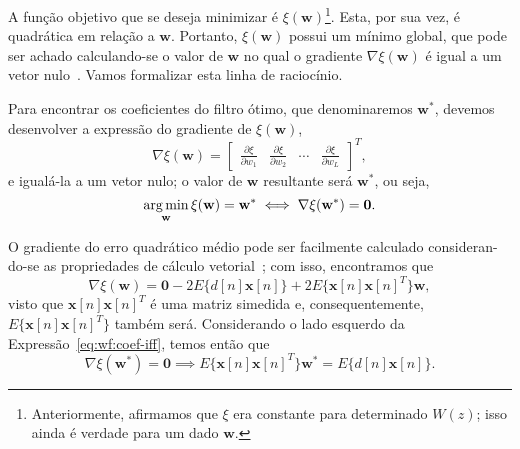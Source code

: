 A função objetivo que se deseja minimizar é $\xi(\mathbf{w})$\footnote{Anteriormente,
	afirmamos que $\xi$ era constante para determinado $W(z)$; isso ainda é verdade para um
	dado $\mathbf{w}$.}. Esta, por sua vez, é quadrática em relação a $\mathbf{w}$.
Portanto, $\xi(\mathbf{w})$ possui um mínimo global, que pode ser achado calculando-se
o valor de $\mathbf{w}$ no qual o gradiente $\nabla
	\xi(\mathbf{w})$ é igual a um vetor
nulo~\cite{diniz-2020}. Vamos formalizar esta linha de raciocínio.

Para encontrar os coeficientes do filtro ótimo, que denominaremos
$\mathbf{w}^*$, devemos
desenvolver a expressão do gradiente de $\xi(\mathbf{w})$,
\begin{equation}
	\nabla\xi(\mathbf{w}) = \begin{bmatrix} \displaystyle \frac{\partial \xi}{\partial w_1} & \displaystyle \frac{\partial \xi}{\partial w_2} & \cdots & \displaystyle \frac{\partial \xi}{\partial w_L} \end{bmatrix}^T,
\end{equation}
e igualá-la a um vetor nulo; o valor de $\mathbf{w}$ resultante será $\mathbf{w}^*$, ou seja,
\begin{equation}
	\operatorname*{arg\,min}_{\mathbf{w}} \xi(\mathbf{w}) = \mathbf{w}^* \iff \nabla\xi(\mathbf{w}^*) = \mathbf{0}.
	\label{eq:wf:coef-iff}
\end{equation}

O gradiente do erro quadrático médio pode ser facilmente calculado consideran-\\do-se
as propriedades de cálculo vetorial~\cite{matrix-cookbook}; com isso, encontramos que
\begin{equation}
	\nabla \xi(\mathbf{w}) = \mathbf{0} - 2 E\{ d[n] \mathbf{x}[n] \} + 2 E\{\mathbf{x}[n]\mathbf{x}[n]^T\} \mathbf{w},
\end{equation}
visto que $\mathbf{x}[n]\mathbf{x}[n]^T$ é uma matriz simedida e, consequentemente, $E\{\mathbf{x}[n]\mathbf{x}[n]^T\}$ também será. Considerando o lado esquerdo da Expressão~\eqref{eq:wf:coef-iff}, temos então que
\begin{equation}
	\nabla\xi(\mathbf{w}^*) = \mathbf{0} \implies E\{\mathbf{x}[n]\mathbf{x}[n]^T\} \mathbf{w}^* = E\{ d[n] \mathbf{x}[n] \}.
	\label{eq:wf:implies}
\end{equation}

